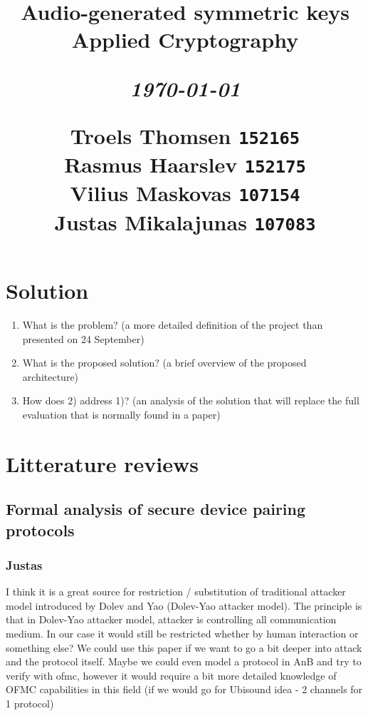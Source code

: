 \documentclass[12pt]{article}
\title{
  \vspace{4cm}
  \begin{flushleft}
  \Large{\textbf{Audio-generated symmetric keys}} \\
  \large{Applied Cryptography}
  \end{flushleft}
  \vspace{0cm}
  \begin{flushleft}
  \small
  \textit{\today}
  \end{flushleft}
  \vspace{12cm}
  \begin{flushleft}
  \small
  Troels Thomsen \texttt{152165} \\
  Rasmus Haarslev \texttt{152175} \\
  Vilius Maskovas \texttt{107154} \\
  Justas Mikalajunas \texttt{107083}\\
  \end{flushleft}
}
\date{
}
\begin{document}
\clearpage
{}
\thispagestyle{empty}
\maketitle

\newpage


\section{Solution}
\label{sec:Solution}

\begin{enumerate}
    \item What is the problem?  (a more detailed definition of the project than presented on 24 September)
    \item What is the proposed solution? (a brief overview of the proposed architecture)
    \item How does 2) address 1)?  (an analysis of the solution that will replace the full evaluation that is normally found in a paper)
\end{enumerate}

\newpage

\section{Litterature reviews}

\subsection{Formal analysis of secure device pairing protocols}
\label{sub:Formal analysis of secure device pairing protocols}

\subsubsection{Justas}
\label{subs:Justas}

I think it is a great source for restriction / substitution of traditional attacker model introduced by Dolev and Yao (Dolev-Yao attacker model).
The principle is that in Dolev-Yao attacker model, attacker is controlling all communication medium. In our case it would still be restricted whether by human interaction or something else?
We could use this paper if we want to go a bit deeper into attack and the protocol itself. Maybe we could even model a protocol in AnB and  try to verify with ofmc, however it would require a bit more detailed knowledge of OFMC capabilities in this field (if we would go for Ubisound idea - 2 channels for 1 protocol)
\end{document}
